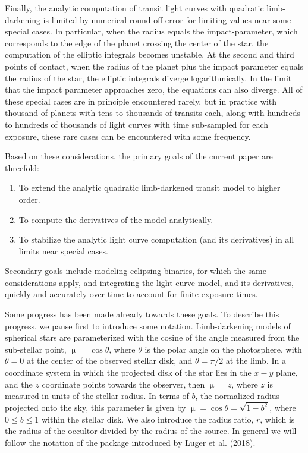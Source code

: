 \documentclass[modern]{aastex61}
\begin{document}
Finally, the analytic computation of transit light curves with quadratic
limb-darkening is limited by numerical round-off error for limiting
values near some special cases.  In
particular, when the radius equals the impact-parameter, which corresponds to
the edge of the planet crossing the center of the star, the computation of the
elliptic integrals becomes unstable.  At the second and third points of
contact, when the radius of the planet plus the impact parameter equals
the radius of the star, the elliptic integrals diverge logarithmically.  In the
limit that the impact parameter approaches zero, the equations can also
diverge.  All of these special cases are in principle encountered rarely,
but in practice with thousand of planets with tens to thousands of
transits each, along with hundreds to hundreds of thousands of light
curves with time sub-sampled for each exposure, these rare cases can
be encountered with some frequency.

Based on these considerations, the primary goals of the current paper are
threefold:
\begin{enumerate}
\item To extend the analytic quadratic limb-darkened transit model to higher order.
\item To compute the derivatives of the model analytically.
\item To stabilize the analytic light curve computation (and its derivatives)
in all limits near special cases.
\end{enumerate}
Secondary goals include modeling eclipsing binaries, for which the same
considerations apply, and integrating the light curve model, and its
derivatives, quickly and accurately over time to account for finite
exposure times.

Some progress has been made already towards these goals.  To describe this
progress, we pause first to introduce some notation.  Limb-darkening models 
of spherical stars are parameterized with the cosine of the angle measured 
from the sub-stellar point, $\upmu = \cos{\theta}$, where $\theta$ is the 
polar angle on the photosphere, with $\theta=0$ at the center of the observed 
stellar disk, and $\theta=\pi/2$ at the limb.  In a coordinate system in which 
the projected disk of the star lies in the $x-y$ plane, and the $z$ coordinate 
points towards the observer, then $\upmu = z$, where $z$ is measured in units 
of the stellar radius.  In terms of $b$, the normalized radius projected onto 
the sky, this parameter is given by $\upmu = \cos{\theta} =\sqrt{1-b^2}$, where
$0\le b \le 1$ within the stellar disk.  We also introduce the radius ratio,
$r$, which is the radius of the occultor divided by the radius of the source.
In general we will follow the notation of the \starry package
introduced by Luger et al. (2018).
\end{document}
